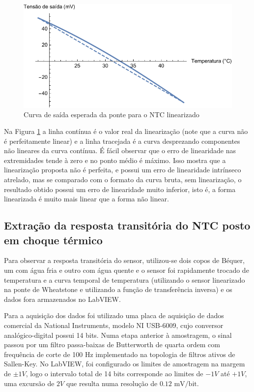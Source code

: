 \documentclass[a4paper]{instrumentacao}
\begin{document}
\begin{figure}[H]
\center
\includegraphics[width=\textwidth]{NTC-Linear-Esperado.pdf}
\caption{Curva de saída esperada da ponte para o NTC linearizado}
\label{fig:ntc-linear-esperado}
\end{figure}

Na Figura \ref{fig:ntc-linear-esperado} a linha contínua é o valor real da linearização (note que a curva não é perfeitamente linear) e a linha tracejada é a curva desprezando componentes não lineares da curva contínua. É fácil observar que o erro de linearidade nas extremidades tende à zero e no ponto médio é máximo. Isso mostra que a linearização proposta não é perfeita, e possui um erro de linearidade intrínseco atrelado, mas se comparado com o formato da curva bruta, sem linearização, o resultado obtido possui um erro de linearidade muito inferior, isto é, a forma linearizada é muito mais linear que a forma não linear.

\subsection{Extração da resposta transitória do NTC posto em choque térmico}
Para observar a resposta transitória do sensor, utilizou-se dois copos de Béquer, um com água fria e outro com água quente e o sensor foi rapidamente trocado de temperatura e a curva temporal de temperatura (utilizando o sensor linearizado na ponte de Wheatstone e utilizando a função de transferência inversa) e os dados fora armazenados no LabVIEW.

Para a aquisição dos dados foi utilizado uma placa de aquisição de dados comercial da National Instruments, modelo NI USB-6009, cujo conversor analógico-digital possui 14 bits\cite{daq-specifications}. Numa etapa anterior à amostragem, o sinal passou por um filtro passa-baixas de Butterworth de quarta ordem com frequência de corte de 100 Hz implementado na topologia de filtros ativos de Sallen-Key. No LabVIEW, foi configurado os limites de amostragem na margem de $\pm 1V$, logo o intervalo total de 14 bits corresponde ao limites de $-1V$ até $+1V$, uma excursão de $2V$ que resulta numa resolução de $0.12\text{ mV/bit}$.
\end{document}
